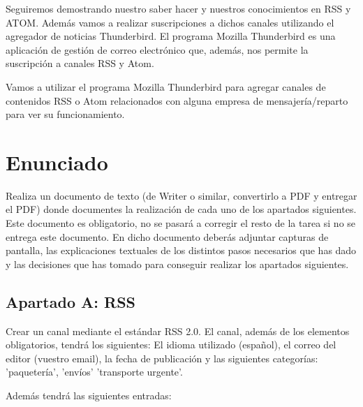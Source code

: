 Seguiremos demostrando nuestro saber hacer y nuestros conocimientos en RSS y ATOM. Además vamos a realizar suscripciones a dichos canales utilizando el agregador de noticias Thunderbird. El programa Mozilla Thunderbird es una aplicación de gestión de correo electrónico que, además, nos permite la suscripción a canales RSS y Atom.

Vamos a utilizar el programa Mozilla Thunderbird para agregar canales de contenidos RSS o Atom relacionados con alguna empresa de mensajería/reparto para ver su funcionamiento.

\section{Enunciado}
Realiza un documento de texto (de Writer o similar, convertirlo a PDF y entregar el PDF) donde documentes la realización de cada uno de los apartados siguientes. Este documento es obligatorio, no se pasará a corregir el resto de la tarea si no se entrega este documento. En dicho documento deberás adjuntar capturas de pantalla, las explicaciones textuales de los distintos pasos necesarios que has dado y las decisiones que has tomado para conseguir realizar los apartados siguientes.

\subsection{Apartado A: RSS}
Crear un canal mediante el estándar RSS 2.0. El canal, además de los elementos obligatorios, tendrá los siguientes: El idioma utilizado (español), el correo del editor (vuestro email), la fecha de publicación y las siguientes categorías: 'paquetería', 'envíos' 'transporte urgente'.

Además tendrá las siguientes entradas:

